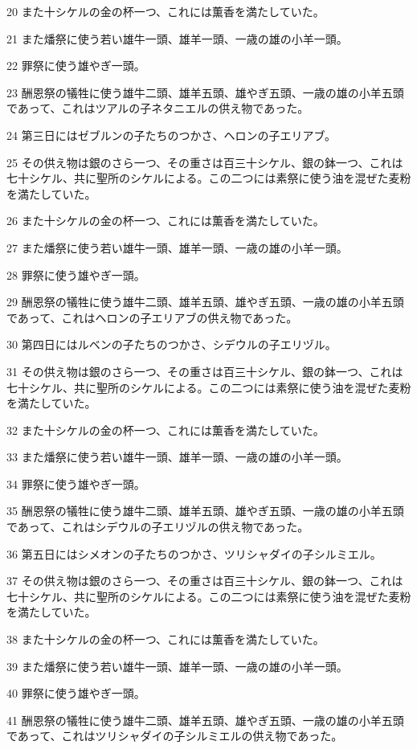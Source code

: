 \par 20 また十シケルの金の杯一つ、これには薫香を満たしていた。
\par 21 また燔祭に使う若い雄牛一頭、雄羊一頭、一歳の雄の小羊一頭。
\par 22 罪祭に使う雄やぎ一頭。
\par 23 酬恩祭の犠牲に使う雄牛二頭、雄羊五頭、雄やぎ五頭、一歳の雄の小羊五頭であって、これはツアルの子ネタニエルの供え物であった。
\par 24 第三日にはゼブルンの子たちのつかさ、ヘロンの子エリアブ。
\par 25 その供え物は銀のさら一つ、その重さは百三十シケル、銀の鉢一つ、これは七十シケル、共に聖所のシケルによる。この二つには素祭に使う油を混ぜた麦粉を満たしていた。
\par 26 また十シケルの金の杯一つ、これには薫香を満たしていた。
\par 27 また燔祭に使う若い雄牛一頭、雄羊一頭、一歳の雄の小羊一頭。
\par 28 罪祭に使う雄やぎ一頭。
\par 29 酬恩祭の犠牲に使う雄牛二頭、雄羊五頭、雄やぎ五頭、一歳の雄の小羊五頭であって、これはヘロンの子エリアブの供え物であった。
\par 30 第四日にはルベンの子たちのつかさ、シデウルの子エリヅル。
\par 31 その供え物は銀のさら一つ、その重さは百三十シケル、銀の鉢一つ、これは七十シケル、共に聖所のシケルによる。この二つには素祭に使う油を混ぜた麦粉を満たしていた。
\par 32 また十シケルの金の杯一つ、これには薫香を満たしていた。
\par 33 また燔祭に使う若い雄牛一頭、雄羊一頭、一歳の雄の小羊一頭。
\par 34 罪祭に使う雄やぎ一頭。
\par 35 酬恩祭の犠牲に使う雄牛二頭、雄羊五頭、雄やぎ五頭、一歳の雄の小羊五頭であって、これはシデウルの子エリヅルの供え物であった。
\par 36 第五日にはシメオンの子たちのつかさ、ツリシャダイの子シルミエル。
\par 37 その供え物は銀のさら一つ、その重さは百三十シケル、銀の鉢一つ、これは七十シケル、共に聖所のシケルによる。この二つには素祭に使う油を混ぜた麦粉を満たしていた。
\par 38 また十シケルの金の杯一つ、これには薫香を満たしていた。
\par 39 また燔祭に使う若い雄牛一頭、雄羊一頭、一歳の雄の小羊一頭。
\par 40 罪祭に使う雄やぎ一頭。
\par 41 酬恩祭の犠牲に使う雄牛二頭、雄羊五頭、雄やぎ五頭、一歳の雄の小羊五頭であって、これはツリシャダイの子シルミエルの供え物であった。
